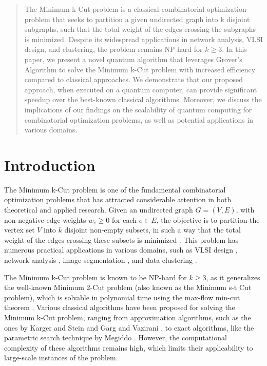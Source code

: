 \begin{abstract}
The Minimum k-Cut problem is a classical combinatorial optimization problem that seeks to partition a given undirected graph into k disjoint subgraphs, such that the total weight of the edges crossing the subgraphs is minimized. Despite its widespread applications in network analysis, VLSI design, and clustering, the problem remains NP-hard for $k \geq 3$. In this paper, we present a novel quantum algorithm that leverages Grover's Algorithm to solve the Minimum k-Cut problem with increased efficiency compared to classical approaches. We demonstrate that our proposed approach, when executed on a quantum computer, can provide significant speedup over the best-known classical algorithms. Moreover, we discuss the implications of our findings on the scalability of quantum computing for combinatorial optimization problems, as well as potential applications in various domains.

\end{abstract}

\section{Introduction}

The Minimum k-Cut problem is one of the fundamental combinatorial optimization problems that has attracted considerable attention in both theoretical and applied research. Given an undirected graph $G=(V,E)$, with non-negative edge weights $w_e \geq 0$ for each $e \in E$, the objective is to partition the vertex set $V$ into $k$ disjoint non-empty subsets, in such a way that the total weight of the edges crossing these subsets is minimized \cite{StoerWagner1997}. This problem has numerous practical applications in various domains, such as VLSI design \cite{KarypisKumar1998}, network analysis \cite{NewmanGirvan2004}, image segmentation \cite{ShiMalik2000}, and data clustering \cite{DhillonGuanKulis2007}.

The Minimum k-Cut problem is known to be NP-hard for $k \geq 3$, as it generalizes the well-known Minimum 2-Cut problem (also known as the Minimum s-t Cut problem), which is solvable in polynomial time using the max-flow min-cut theorem \cite{FordFulkerson1956}. Various classical algorithms have been proposed for solving the Minimum k-Cut problem, ranging from approximation algorithms, such as the ones by Karger and Stein \cite{KargerStein1996} and Garg and Vazirani \cite{GargVazirani1996}, to exact algorithms, like the parametric search technique by Megiddo \cite{Megiddo1983}. However, the computational complexity of these algorithms remains high, which limits their applicability to large-scale instances of the problem.

